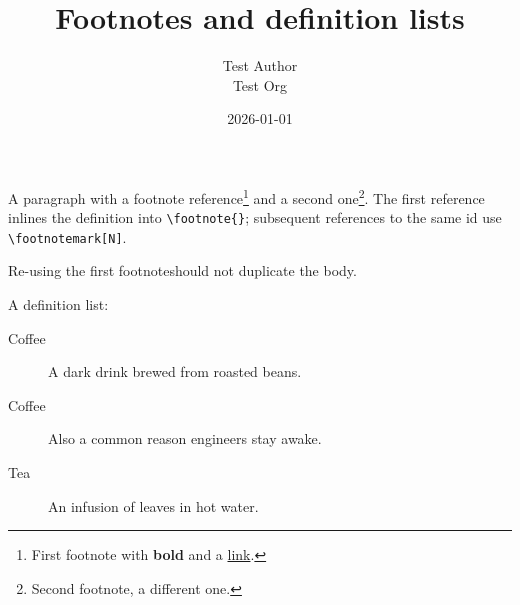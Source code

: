 \documentclass[11pt,a4paper]{article}
\title{Footnotes and definition lists}
\author{Test Author \\ Test Org}
\date{2026-01-01}
\theoremstyle{definition}
\begin{document}
\maketitle

A paragraph with a footnote reference\footnote{First footnote with \textbf{bold} and a \href{https://example.com}{link}.} and a second one\footnote{Second footnote, a different one.}. The first reference inlines the definition into \texttt{\textbackslash{}footnote\{\}}; subsequent references to the same id use \texttt{\textbackslash{}footnotemark[N]}.


Re-using the first footnote\footnotemark[1] should not duplicate the body.



A definition list:


\begin{description}
  \item[Coffee] A dark drink brewed from roasted beans.
  \item[Coffee] Also a common reason engineers stay awake.
\end{description}

\begin{description}
  \item[Tea] An infusion of leaves in hot water.
\end{description}
\end{document}

